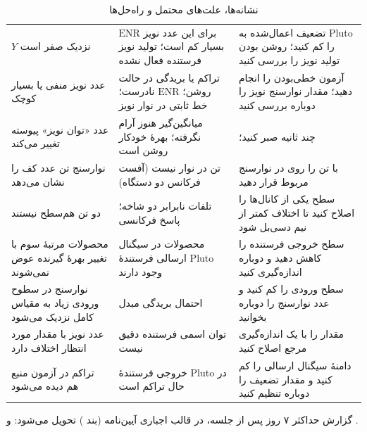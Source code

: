 \documentclass[a4paper,11pt]{article}
\begin{document}
\begin{table}[H]
	\centering\small
	\caption{نشانه‌ها، علت‌های محتمل و راه‌حل‌ها}
	\label{tab:trouble8}
	\begin{tabularx}{\linewidth}{|X|X|X|}
		\hline
		\hdrrow \hdr{نشانه} & \hdr{علت محتمل} & \hdr{راه‌حل} \\ \hline
		$Y$ نزدیک صفر است & $\mathrm{ENR}$ برای این عدد نویز بسیار کم است؛ تولید نویز فرستنده فعال نشده & تضعیف اعمال‌شده به Pluto را کم کنید؛ روشن بودن تولید نویز را بررسی کنید \\ \hline
		عدد نویز منفی یا بسیار کوچک & تراکم یا بریدگی در حالت روشن؛ $\mathrm{ENR}$ نادرست؛ خط ثابتی در نوار نویز & آزمون خطی‌بودن را انجام دهید؛ مقدار نوارسنج نویز را دوباره بررسی کنید \\ \hline
		عدد «توان نویز» پیوسته تغییر می‌کند & میانگین‌گیر هنوز آرام نگرفته؛ بهرهٔ خودکار روشن است & چند ثانیه صبر کنید؛ \pv{AGC}{False} \\ \hline
		نوارسنج تن عدد کف را نشان می‌دهد & تن در نوار نیست (آفست فرکانس دو دستگاه) & با \code{f_corr} تن را روی \q{300}{kHz} در نوارسنج مربوط قرار دهید \\ \hline
		دو تن هم‌سطح نیستند & تلفات نابرابر دو شاخه؛ پاسخ فرکانسی & سطح یکی از کانال‌ها را اصلاح کنید تا اختلاف کمتر از نیم دسی‌بل شود \\ \hline
		محصولات مرتبهٔ سوم با تغییر بهرهٔ گیرنده عوض نمی‌شوند & محصولات در سیگنال ارسالی فرستندهٔ Pluto وجود دارند & سطح خروجی فرستنده را کاهش دهید و دوباره اندازه‌گیری کنید \\ \hline
		نوارسنج در سطوح ورودی زیاد به مقیاس کامل نزدیک می‌شود & احتمال بریدگی مبدل & سطح ورودی را کم کنید و عدد نوارسنج را دوباره بخوانید \\ \hline
		عدد نویز با مقدار مورد انتظار اختلاف دارد & توان اسمی فرستنده دقیق نیست & مقدار \code{p_max} را با یک اندازه‌گیری مرجع اصلاح کنید \\ \hline
		تراکم در آزمون منبع هم دیده می‌شود & خروجی فرستندهٔ Pluto در حال تراکم است & دامنهٔ سیگنال ارسالی را کم کنید و مقدار تضعیف را دوباره تنظیم کنید \\ \hline
	\end{tabularx}
\end{table}

گزارش حداکثر ۷ روز پس از جلسه، در قالب اجباری آیین‌نامه (بند
)
تحویل می‌شود:
و
.
\end{document}
